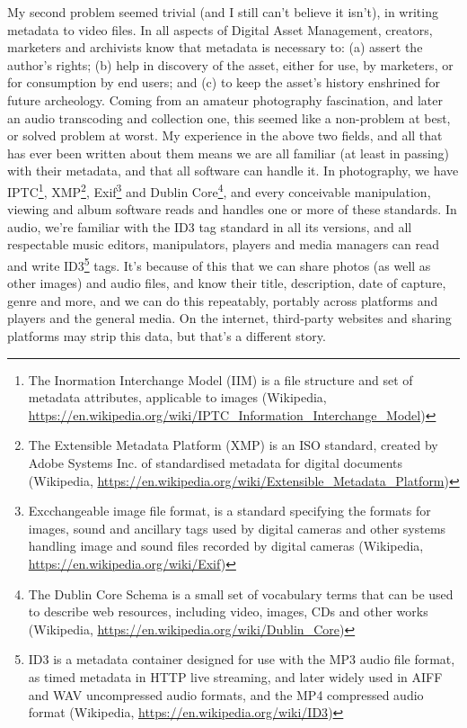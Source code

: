 \documentclass{article}
\begin{document}
My second problem seemed trivial (and I still can't believe it isn't), in
writing metadata to video files. In all aspects of Digital Asset Management,
creators, marketers and archivists know that metadata is necessary to: (a)
assert the author's rights; (b) help in discovery of the asset, either for use,
by marketers, or for consumption by end users; and (c) to keep the asset's
history enshrined for future archeology. Coming from an amateur photography
fascination, and later an audio transcoding and collection one, this seemed like
a non-problem at best, or solved problem at worst. My experience in the above
two fields, and all that has ever been written about them means we are all
familiar (at least in passing) with their metadata, and that all software can
handle it. In photography, we have IPTC\footnote{The Inormation Interchange Model (IIM) is a file structure and set of
metadata attributes, applicable to images (Wikipedia, \href{https://en.wikipedia.org/wiki/IPTC\_Information\_Interchange\_Model}{\url{https://en.wikipedia.org/wiki/IPTC\_Information\_Interchange\_Model}})}, XMP\footnote{The Extensible Metadata Platform (XMP) is an ISO standard, 
created by Adobe Systems Inc. of standardised metadata for digital documents
(Wikipedia, \href{https://en.wikipedia.org/wiki/Extensible\_Metadata\_Platform}{\url{https://en.wikipedia.org/wiki/Extensible\_Metadata\_Platform}})}, Exif\footnote{Excchangeable image file format, is a standard specifying the formats
for images, sound and ancillary tags used by digital cameras and other systems
handling image and sound files recorded by digital cameras (Wikipedia, \href{https://en.wikipedia.org/wiki/Extensible\_Metadata\_Platform}{\url{https://en.wikipedia.org/wiki/Exif}})} and Dublin
Core\footnote{The Dublin Core Schema is a small set of vocabulary terms that can be
used to describe web resources, including video, images, CDs and other works
(Wikipedia, \href{https://en.wikipedia.org/wiki/Dublin\_Core}{\url{https://en.wikipedia.org/wiki/Dublin\_Core}})}, and every conceivable manipulation, viewing and album software
reads and handles one or more of these standards. In audio, we're familiar with
the ID3 tag standard in all its versions, and all respectable music editors,
manipulators, players and media managers can read and write ID3\footnote{ID3 is a metadata container designed for use with the MP3 audio file
format, as timed metadata in HTTP live streaming, and later widely used in AIFF
and WAV uncompressed audio formats, and the MP4 compressed audio format
(Wikipedia, \href{https://en.wikipedia.org/wiki/ID3}{\url{https://en.wikipedia.org/wiki/ID3}})} tags. It's
because of this that we can share photos (as well as other images) and audio
files, and know their title, description, date of capture, genre and more, and
we can do this repeatably, portably across platforms and players and the general
media. On the internet, third-party websites and sharing platforms may strip
this data, but that's a different story.
\end{document}
